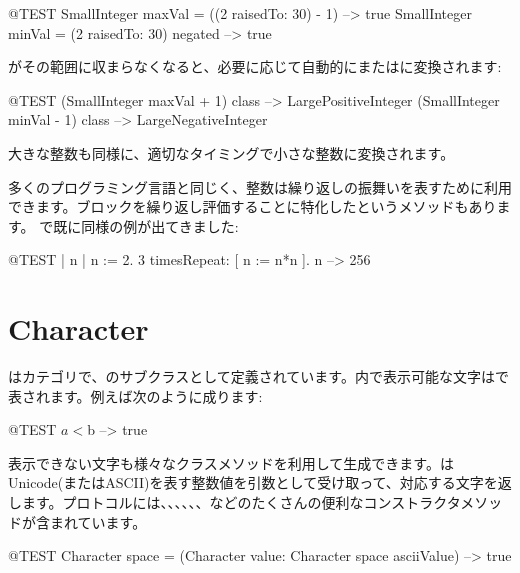 \documentclass[a4paper,10pt,twoside]{book}
\begin{document}
\begin{code}{@TEST}
SmallInteger maxVal = ((2 raisedTo: 30) - 1)      --> true
SmallInteger minVal = (2 raisedTo: 30) negated --> true
\end{code}

がその範囲に収まらなくなると、必要に応じて自動的にまたはに変換されます:

\begin{code}{@TEST}
(SmallInteger maxVal + 1) class --> LargePositiveInteger
(SmallInteger minVal - 1) class  --> LargeNegativeInteger
\end{code}

大きな整数も同様に、適切なタイミングで小さな整数に変換されます。

多くのプログラミング言語と同じく、整数は繰り返しの振舞いを表すために利用できます。ブロックを繰り返し評価することに特化したというメソッドもあります。
で既に同様の例が出てきました:
\begin{code}{@TEST | n |}
n := 2.
3 timesRepeat: [ n := n*n ].
n --> 256
\end{code}

\section{Character}

はカテゴリで、のサブクラスとして定義されています。\pharo 内で表示可能な文字はで表されます。例えば次のように成ります:

\begin{code}{@TEST}
$a < $b --> true
\end{code}

表示できない文字も様々なクラスメソッドを利用して生成できます。\mbox{}はUnicode(またはASCII)を表す整数値を引数として受け取って、対応する文字を返します。プロトコルには、、、、、、などのたくさんの便利なコンストラクタメソッドが含まれています。

\begin{code}{@TEST}
Character space = (Character value: Character space asciiValue) --> true
\end{code}
\end{document}
